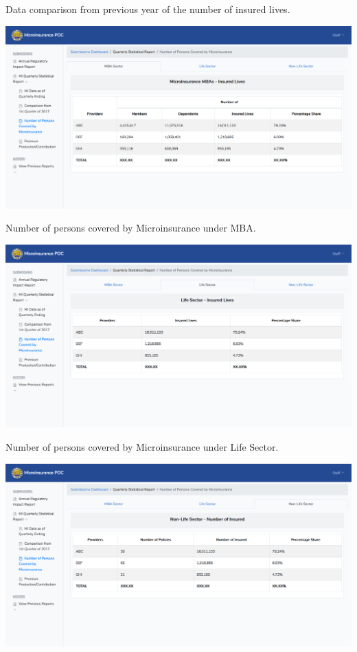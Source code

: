 \documentclass{article}
\begin{document}
Data comparison from previous year of the number of
insured lives.%

\includegraphics[keepaspectratio=true]{up-ic-screens/image143}{}%

Number of persons covered by Microinsurance under
MBA.%

\includegraphics[keepaspectratio=true]{up-ic-screens/image42}{}%

Number of persons covered by Microinsurance under Life
Sector.%

\includegraphics[keepaspectratio=true]{up-ic-screens/image66}{}%
\end{document}
